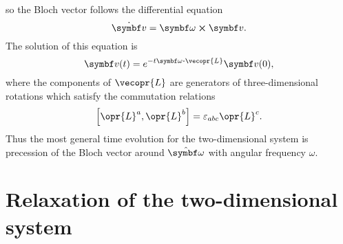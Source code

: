 \documentclass[../thesis.tex]{subfiles}
\begin{document}
so the Bloch vector follows the differential equation
\begin{equation}
  \dot{\vq{v}}
  = \vq{\omega} \cross \vq{v}.
\end{equation}
The solution of this equation is
\begin{equation}
  \vq{v}(t)
  = e^{-t \vq{\omega} \vdot \vecopr{L}} \vq{v}(0),
\end{equation}
where the components of $\vecopr{L}$ are generators of three-dimensional
rotations which satisfy the commutation relations
\begin{equation}
  \comm{\opr{L}^a}{\opr{L}^b}
  = \varepsilon_{abc} \opr{L}^c.
\end{equation}
Thus the most general time evolution for the two-dimensional system is
precession of the Bloch vector around $\vu{\omega}$ with angular frequency
$\omega$.


\section{Relaxation of the two-dimensional system}
\end{document}
